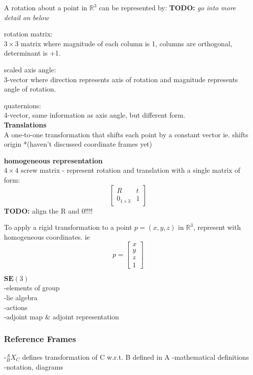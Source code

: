 		A rotation about a point in $\mathbb{R}^3$ can be represented by: \textbf{TODO:} \textit{go into more detail on below}
		
		rotation matrix:\\
		$3\times3$ matrix where magnitude of each column is 1, columns are orthogonal, determinant is +1.
		
		scaled axis angle:\\
		3-vector where direction represents axis of rotation and magnitude represents angle of rotation.		
		
		quaternions:\\
		4-vector, same information as axis angle, but different form.\\
		
		\textbf{Translations}\\
		A one-to-one transformation that shifts each point by a constant vector ie. shifts origin *(haven't discussed coordinate frames yet) 

		\textbf{homogeneous representation}\\
		$4\times4$ screw matrix - represent rotation and translation with a single matrix of form:\\
		
		\begin{equation}
				\begin{bmatrix}
				  R		&	t \\
				  0_{1\times3}		& 	1 
				\end{bmatrix}
		\end{equation}
		\textbf{TODO:} align the R and 0!!!!

		To apply a rigid transformation to a point $p = (x,y,z) $ in $\mathbb{R}^3$, represent with homogeneous coordinates. ie
		\begin{equation}
		p = 
		\begin{bmatrix}
				  x	\\
				  y	\\
				  z	\\
				  1	
		\end{bmatrix}
		\end{equation}
	
		\textbf{ $\textbf{SE}(3)$}\\
		-elements of group\\
		-lie algebra\\
		-actions\\
		-adjoint map \& adjoint representation
		
	\subsubsection{Reference Frames}
		-$^{A}_{B}X^{}_{C}$ defines transformation of C w.r.t. B defined in A
		-mathematical definitions\\
		-notation, diagrams
